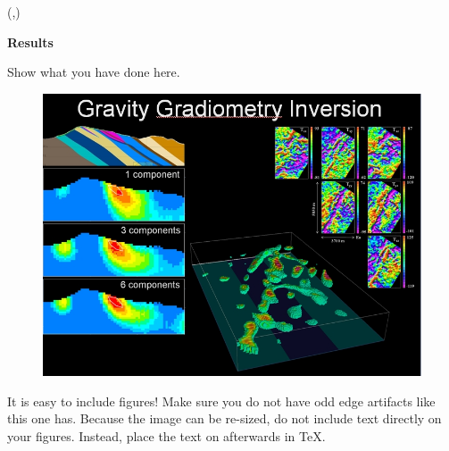 \documentclass[dark]{cgem-poster}
\begin{document}
  \begin{textblock*}{\PosterColumnTwoTextWidth{}}(\PosterColumnTwoTextLeft{},\PosterColumnTwoTextTop{})
    \begin{minipage}[t][\PosterColumnTwoTextHeight{}][t]{\PosterColumnTwoTextWidth{}}
      \vspace{5mm}
      \begin{center}
        \large
        \textbf{Results}
      \end{center}

      \vspace{5mm}
      \small
      Show what you have done here.

      \vspace{20cm}
      \begin{figure}
        \centering
        \includegraphics[width=0.95\PosterColumnTwoTextWidth{}]{YauguoExample}
      \end{figure}

      \vspace{1cm}
      It is easy to include figures! %
      Make sure you do not have odd edge artifacts like this one has. %
      Because the image can be re-sized, do not include text directly on your figures. %
      Instead, place the text on afterwards in \TeX{}.

    \end{minipage}
  \end{textblock*}

  \newcommand{\PosterColumnThreeTextLeft}{\dimexpr (\PosterColumnThreeLeft + \PosterTextMarginSize)\relax}
  \newcommand{\PosterColumnThreeTextWidth}{\dimexpr (\PosterColumnThreeWidth - 2\PosterTextMarginSize)\relax}
  \newcommand{\PosterColumnThreeTextTop}{\dimexpr (\PosterColumnThreeTop + \PosterTextMarginSize)\relax}
  \newcommand{\PosterColumnThreeTextHeight}{\dimexpr (\PosterColumnThreeHeight - 2\PosterTextMarginSize)\relax}
\end{document}
